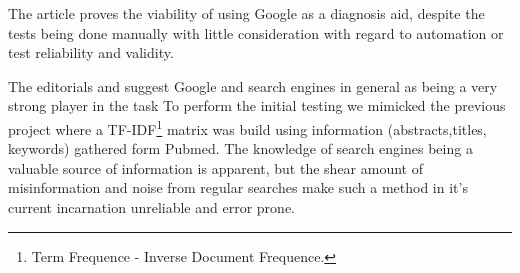 \documentclass[10pt,letterpaper,final]{article}
\begin{document}
The article \cite{googlingdiagnosis} proves the viability of using
Google as a diagnosis aid, despite the tests being done manually with
little consideration with regard to automation or test reliability and
validity.



The editorials \cite{googlechangemedicine} and
\cite{diagnosissearchengines} suggest Google and search engines in
general as being a very strong player in the task To perform the initial
testing we mimicked the previous project where a TF-IDF\footnote{Term Frequence - Inverse Document Frequence.} matrix was build
using information (abstracts,titles, keywords) gathered form Pubmed. The
knowledge of search engines being a valuable source of information is
apparent, but the shear amount of misinformation and noise from regular
searches make such a method in it’s current incarnation unreliable and
error prone. 










\end{document}
